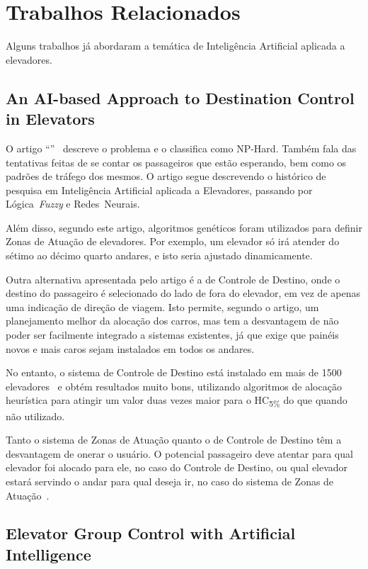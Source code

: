 \chapter{\label{chap:related}Trabalhos Relacionados}

Alguns trabalhos já abordaram a temática de Inteligência Artificial aplicada a
elevadores. %

\section{An AI-based Approach to Destination Control in
  Elevators}
O artigo ``\textit{}''~\cite{KOEHLEROTTIGER02} descreve o problema e o classifica como
NP-Hard. Também fala das tentativas feitas de se contar os passageiros que estão
esperando, bem como os padrões de tráfego dos mesmos. O artigo segue descrevendo
o histórico de pesquisa em Inteligência Artificial aplicada a Elevadores,
passando por Lógica~\textit{Fuzzy} e Redes~Neurais. 

Além disso, segundo este artigo, algoritmos genéticos foram utilizados para definir Zonas de
Atuação de elevadores. Por exemplo, um elevador só irá atender do sétimo ao
décimo quarto andares, e isto seria ajustado dinamicamente.

Outra alternativa apresentada pelo artigo é a de Controle de Destino, onde o
destino do passageiro é selecionado do lado de fora do elevador, em vez de
apenas uma indicação de direção de viagem. Isto permite, segundo o artigo, um
planejamento melhor da alocação dos carros, mas tem a desvantagem de não poder
ser facilmente integrado a sistemas existentes, já que exige que painéis novos e
mais caros sejam instalados em todos os andares.

No entanto, o sistema de Controle de Destino está instalado em mais de 1500
elevadores~\cite{KOEHLEROTTIGER02} e obtém resultados muito bons, utilizando
algoritmos de alocação heurística para atingir um valor duas vezes maior para o
HC\textsubscript{5\%} do que quando não utilizado.

Tanto o sistema de Zonas de Atuação quanto o de Controle de Destino têm a
desvantagem de onerar o usuário. O potencial passageiro deve atentar para qual
elevador foi alocado para ele, no caso do Controle de Destino, ou qual elevador
estará servindo o andar para qual deseja ir, no caso do sistema de Zonas de Atuação~\cite{KOEHLEROTTIGER02}.

\section{Elevator Group Control with Artificial Intelligence}

